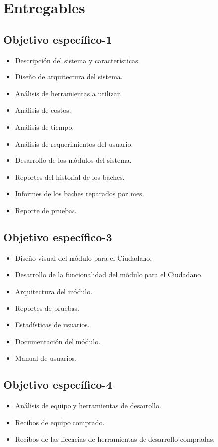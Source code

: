 \chapter{Entregables}

\section{Objetivo específico-1}
\begin{itemize}
    \item Descripción del sistema y características. 
    \item Diseño de arquitectura del sistema.
    \item Análisis de herramientas a utilizar.
    \item Análisis de costos.
    \item Análisis de tiempo.
    \item Análisis de requerimientos del usuario.
    \item Desarrollo de los módulos del sistema.
    \item Reportes del historial de los baches.
    \item Informes de los baches reparados por mes.
    \item Reporte de pruebas.
\end{itemize}

\section{Objetivo específico-3}
\begin{itemize}
    \item Diseño visual del módulo para el Ciudadano. 
    \item Desarrollo de la funcionalidad del módulo para el Ciudadano.
    \item Arquitectura del módulo.
    \item Reportes de pruebas.
    \item Estadísticas de usuarios.
    \item Documentación del módulo.
    \item Manual de usuarios.
\end{itemize}


\section{Objetivo específico-4}
\begin{itemize}
    \item Análisis de equipo y herramientas de desarrollo.
    \item Recibos de equipo comprado.
    \item Recibos de las licencias de herramientas de desarrollo compradas.
\end{itemize}

